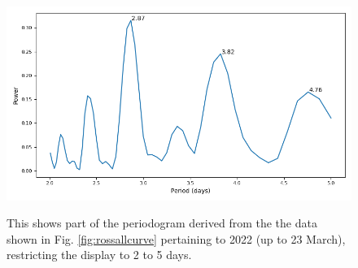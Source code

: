 \begin{figure}[!htbp]
\begin{center}
\includegraphics[scale=0.40]{REM/images/rem2022pgram.png} \\
\vspace{-.5cm}
\end{center}   
\caption{This shows part of the periodogram derived from the the data shown in
Fig. \ref{fig:rossallcurve} pertaining to 2022 (up
to 23 March), restricting the display to 2 to 5 days.}\protect\label{fig:rossallpgram}
\end{figure}

